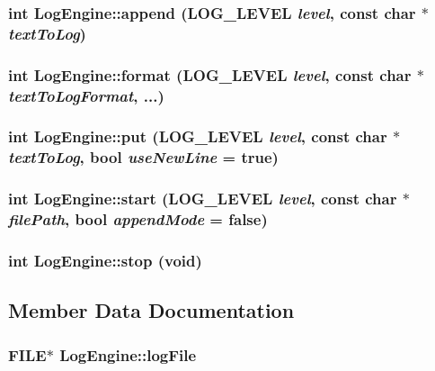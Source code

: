\subsubsection{\setlength{\rightskip}{0pt plus 5cm}int Log\-Engine::append ({\bf LOG\_\-LEVEL} {\em level}, const char $\ast$ {\em text\-To\-Log})}\label{classLogEngine_a3}


\subsubsection{\setlength{\rightskip}{0pt plus 5cm}int Log\-Engine::format ({\bf LOG\_\-LEVEL} {\em level}, const char $\ast$ {\em text\-To\-Log\-Format}, ...)}\label{classLogEngine_a2}


\subsubsection{\setlength{\rightskip}{0pt plus 5cm}int Log\-Engine::put ({\bf LOG\_\-LEVEL} {\em level}, const char $\ast$ {\em text\-To\-Log}, bool {\em use\-New\-Line} = true)}\label{classLogEngine_a1}


\subsubsection{\setlength{\rightskip}{0pt plus 5cm}int Log\-Engine::start ({\bf LOG\_\-LEVEL} {\em level}, const char $\ast$ {\em file\-Path}, bool {\em append\-Mode} = false)}\label{classLogEngine_a0}


\subsubsection{\setlength{\rightskip}{0pt plus 5cm}int Log\-Engine::stop (void)}\label{classLogEngine_a4}




\subsection{Member Data Documentation}
\subsubsection{\setlength{\rightskip}{0pt plus 5cm}FILE$\ast$ {\bf Log\-Engine::log\-File}\hspace{0.3cm}{\tt  [private]}}\label{classLogEngine_r0}


